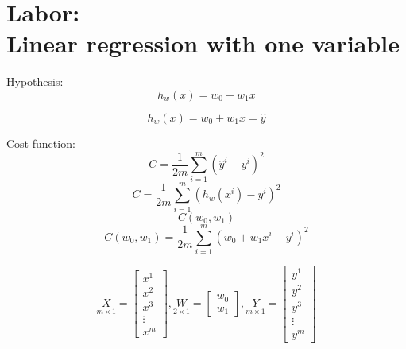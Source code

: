 \documentclass[12pt]{article}
\begin{document}
\section{Labor:\\ \large Linear regression with one variable}

\noindent
Hypothesis:\\
\begin{equation}
h_{w}(x)=w_{0}+w_{1}x
\end{equation}

\begin{equation}
h_{w}(x)=w_{0}+w_{1}x= \hat{y}
\end{equation}

Cost function:\\
\begin{equation}
C=\frac{1}{2m}\sum_{i=1}^{m}(\hat{y}^{i}-y^{i})^2
\end{equation}
\begin{equation}
C=\frac{1}{2m}\sum_{i=1}^{m}(h_w(x^{i})-y^{i})^2
\end{equation}
\begin{equation}
C(w_{0},w_{1})
\end{equation}
\begin{equation}
C(w_{0},w_{1})=\frac{1}{2m}\sum_{i=1}^{m}(w_{0}+w_{1}x^{i}-y^{i})^2
\end{equation}

\begin{equation}
\underset{m\times 1}{X}=\left[
\begin{matrix}
	x^{1}\\
	x^{2}\\
	x^{3}\\
	\vdots\\
	x^{m}
\end{matrix} \right], 
\underset{2\times 1}{W}=\left[
\begin{matrix}
	w_{0}\\
	w_{1}
\end{matrix} \right],
\underset{m\times 1}{Y}=\left[
\begin{matrix}
	y^{1}\\
	y^{2}\\
	y^{3}\\
	\vdots\\
	y^{m}
\end{matrix} \right]
\end{equation}
\end{document}
